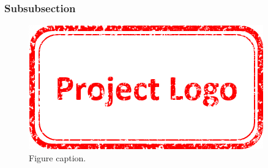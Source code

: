 \subsubsection{Subsubsection} \label{sec:subsubsection}

\lipsum[5-6]

\begin{figure}
  \centering
  \includegraphics[width=.5\textwidth]{./graphics/logo_project.png}
  \caption{Figure caption.}
  \label{fig:test}
\end{figure}

\lipsum[7-8]
